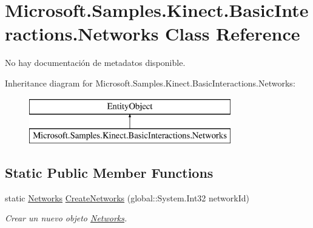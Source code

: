\hypertarget{class_microsoft_1_1_samples_1_1_kinect_1_1_basic_interactions_1_1_networks}{\section{Microsoft.\-Samples.\-Kinect.\-Basic\-Interactions.\-Networks Class Reference}
\label{class_microsoft_1_1_samples_1_1_kinect_1_1_basic_interactions_1_1_networks}
}


No hay documentación de metadatos disponible.  


Inheritance diagram for Microsoft.\-Samples.\-Kinect.\-Basic\-Interactions.\-Networks\-:\begin{figure}[H]
\begin{center}
\leavevmode
\includegraphics[height=2.000000cm]{class_microsoft_1_1_samples_1_1_kinect_1_1_basic_interactions_1_1_networks}
\end{center}
\end{figure}
\subsection*{Static Public Member Functions}
\begin{DoxyCompactItemize}
\item 
static \hyperlink{class_microsoft_1_1_samples_1_1_kinect_1_1_basic_interactions_1_1_networks}{Networks} \hyperlink{class_microsoft_1_1_samples_1_1_kinect_1_1_basic_interactions_1_1_networks_add356b8b76fe9e60b6fce323939dbe97}{Create\-Networks} (global\-::\-System.\-Int32 network\-Id)
\begin{DoxyCompactList}\small\item\em Crear un nuevo objeto \hyperlink{class_microsoft_1_1_samples_1_1_kinect_1_1_basic_interactions_1_1_networks}{Networks}. \end{DoxyCompactList}\end{DoxyCompactItemize}
